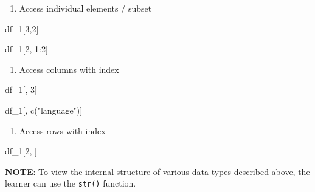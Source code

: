 \documentclass[
  letterpaper,
  DIV=11,
  numbers=noendperiod]{scrreprt}
\newenvironment{Shaded}{}{}
\newcommand{\DecValTok}[1]{\textcolor[rgb]{0.00,0.36,0.77}{#1}}
\newcommand{\FunctionTok}[1]{\textcolor[rgb]{0.44,0.26,0.76}{#1}}
\newcommand{\NormalTok}[1]{\textcolor[rgb]{0.14,0.16,0.18}{#1}}
\newcommand{\SpecialCharTok}[1]{\textcolor[rgb]{0.00,0.36,0.77}{#1}}
\newcommand{\StringTok}[1]{\textcolor[rgb]{0.01,0.18,0.38}{#1}}
\providecommand{\tightlist}{%
  \setlength{\itemsep}{0pt}\setlength{\parskip}{0pt}}\usepackage{longtable,booktabs,array}
\begin{document}
\begin{enumerate}
\def\labelenumi{\roman{enumi}.}
\tightlist
\item
  Access individual elements / subset
\end{enumerate}

\begin{Shaded}
\begin{Highlighting}[]
\NormalTok{df\_1[}\DecValTok{3}\NormalTok{,}\DecValTok{2}\NormalTok{]}
\end{Highlighting}
\end{Shaded}

\begin{Shaded}
\begin{Highlighting}[]
\NormalTok{df\_1[}\DecValTok{2}\NormalTok{, }\DecValTok{1}\SpecialCharTok{:}\DecValTok{2}\NormalTok{]}
\end{Highlighting}
\end{Shaded}

\begin{enumerate}
\def\labelenumi{\alph{enumi}.}
\setcounter{enumi}{9}
\tightlist
\item
  Access columns with index
\end{enumerate}

\begin{Shaded}
\begin{Highlighting}[]
\NormalTok{df\_1[, }\DecValTok{3}\NormalTok{]}
\end{Highlighting}
\end{Shaded}

\begin{Shaded}
\begin{Highlighting}[]
\NormalTok{df\_1[, }\FunctionTok{c}\NormalTok{(}\StringTok{"language"}\NormalTok{)]}
\end{Highlighting}
\end{Shaded}

\begin{enumerate}
\def\labelenumi{\alph{enumi}.}
\setcounter{enumi}{10}
\tightlist
\item
  Access rows with index
\end{enumerate}

\begin{Shaded}
\begin{Highlighting}[]
\NormalTok{df\_1[}\DecValTok{2}\NormalTok{, ] }
\end{Highlighting}
\end{Shaded}

\textbf{NOTE}: To view the internal structure of various data types
described above, the learner can use the \texttt{str()} function.
\end{document}
